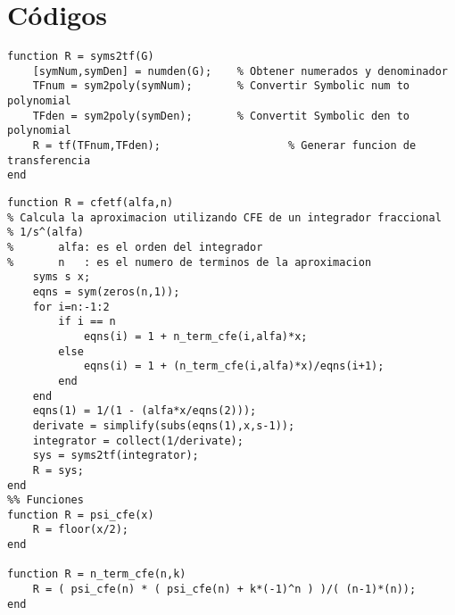 \chapter{Códigos}

\begin{lstlisting}[style = MATLAB, caption =  Función syms2tf, label = cod:syms2tf]
% Converir funcion simbolica a TF
function R = syms2tf(G)
    [symNum,symDen] = numden(G); 	% Obtener numerados y denominador
    TFnum = sym2poly(symNum);    	% Convertir Symbolic num to polynomial
    TFden = sym2poly(symDen);    	% Convertit Symbolic den to polynomial
    R = tf(TFnum,TFden);					% Generar funcion de transferencia
end
\end{lstlisting}

\begin{lstlisting}[style = MATLAB, caption =  Función cfetf, label = cod:cfetf]
function R = cfetf(alfa,n)
% Calcula la aproximacion utilizando CFE de un integrador fraccional
% 1/s^(alfa)
%       alfa: es el orden del integrador
%       n   : es el numero de terminos de la aproximacion
    syms s x;
    eqns = sym(zeros(n,1));
    for i=n:-1:2
        if i == n
            eqns(i) = 1 + n_term_cfe(i,alfa)*x;
        else
            eqns(i) = 1 + (n_term_cfe(i,alfa)*x)/eqns(i+1);
        end
    end
    eqns(1) = 1/(1 - (alfa*x/eqns(2)));
    derivate = simplify(subs(eqns(1),x,s-1));
    integrator = collect(1/derivate);
    sys = syms2tf(integrator);
    R = sys;
end
%% Funciones
function R = psi_cfe(x)
    R = floor(x/2);
end 

function R = n_term_cfe(n,k)
    R = ( psi_cfe(n) * ( psi_cfe(n) + k*(-1)^n ) )/( (n-1)*(n));
end
\end{lstlisting}


